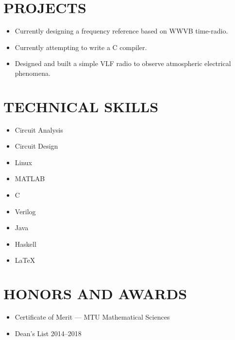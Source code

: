 \documentclass[letterpaper]{res}
\begin{document}
\begin{resume}

  \section{PROJECTS}
  \begin{itemize}
	\item Currently designing a frequency reference based on WWVB time-radio.
    \item Currently attempting to write a C compiler.
    \item Designed and built a simple VLF radio to observe atmospheric electrical phenomena.
  \end{itemize}

  \section{TECHNICAL SKILLS}
  \vspace{-1pt}
  \begin{multicols}{3}
    \begin{itemize} \itemsep1pt \parskip0pt 
      \item Circuit Analysis
	  \item Circuit Design
      \item Linux
      \item MATLAB
      \item C
      \item Verilog
      \item Java
      \item Haskell
      \item LaTeX
    \end{itemize}
  \end{multicols}

  \section{HONORS AND AWARDS}
  \begin{itemize}
    \item Certificate of Merit --- MTU Mathematical Sciences
    \item Dean's List 2014--2018
  \end{itemize}

\end{resume}
\end{document}
